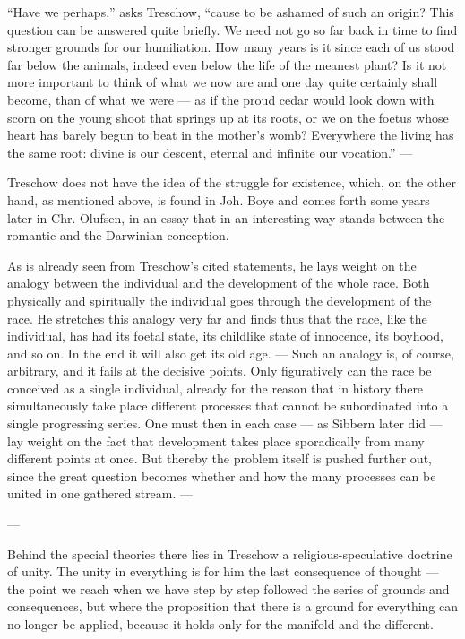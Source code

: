 \documentclass[12pt,a4paper]{book}
\newcommand{\opage}[1]{\marginnote{\footnotesize\textit{[#1]}}}
\begin{document}
``Have we perhaps,'' asks Treschow, ``cause to be ashamed of such an origin? This
question can be answered quite briefly. We need not go so far back in time to find
stronger grounds for our humiliation. How many years is it since each of us stood far
below the animals, indeed even below the life of the meanest plant? Is it not more
important to think of what we now are and one day quite certainly \opage{94}shall become, than of
what we were --- as if the proud cedar would look down with scorn on the young shoot that
springs up at its roots, or we on the foetus whose heart has barely begun to beat in the
mother's womb? Everywhere the living has the same root: divine is our descent, eternal
and infinite our vocation.'' ---

Treschow does not have the idea of the struggle for existence, which, on the other hand,
as mentioned above, is found in Joh. Boye and comes forth some years later in Chr.
Olufsen, in an essay that in an interesting way stands between the romantic and the
Darwinian conception.

As is already seen from Treschow's cited statements, he lays weight on the analogy
between the individual and the development of the whole race. Both physically and
spiritually the individual goes through the development of the race. He stretches this
analogy very far and finds thus that the race, like the individual, has had its foetal
state, its childlike state of innocence, its boyhood, and so on. In the end it will also
get its old age. --- Such an analogy is, of course, arbitrary, and it fails at the
decisive points. Only figuratively can the race be conceived as a single individual,
already for the reason that in history there simultaneously take place different
processes that cannot be subordinated into a single progressing series. One must then in
each case --- as Sibbern later did --- lay weight on the fact that development takes
place sporadically from many different points at once. But thereby the problem itself is
pushed further out, since the great question becomes whether and how the many processes
can be united in one gathered stream. ---

\begin{center}---\end{center}

Behind the special theories there lies in Treschow a religious-speculative doctrine of
unity. The unity in everything is for him the last consequence of thought --- the point
we reach when we have step by step followed the series of grounds and consequences, but
where the proposition that there is a ground for everything \opage{95}can no longer be applied,
because it holds only for the manifold and the different.
\end{document}

